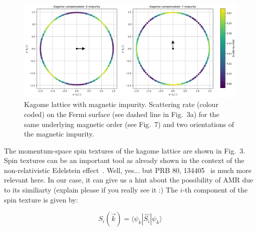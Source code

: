 \documentclass[prb,showpacs,amsmath,amssymb,superscriptaddress,twocolumn,floatfix]{revtex4-1}
\begin{document}

\begin{figure}
\includegraphics[scale=0.27]{img/fig9.png}
\caption{%
Kagome lattice with magnetic impurity. Scattering rate (colour coded) on
the Fermi surface (see dashed line in Fig.~3a) for the same underlying
magnetic order (see Fig.~7) and two orientations of the magnetic impurity.}
\label{fig-09}
\end{figure}

The momentum-space spin textures of the kagome lattice %
are shown in Fig.~3.  %
Spin textures can be an important tool as already shown in the context of the non-relativistic Edelstein effect~\cite{Gonzalez-Hernandez:2024}.
{\color{red}Well, yes... but PRB 80, 134405~\cite{Trushin:2009_a} is much more relevant here.} In our case, it can give us a hint about the possibility of AMR due to its similiarty
{\color{red}(explain please if you really see it :)} The $i$-th component of the spin texture is given by:

\begin{equation}
	S_i (\vec{k}) = \langle \psi_k | \hat{S_i} | \psi_k \rangle
	\label{eq_spintexture}
\end{equation}
\end{document}

